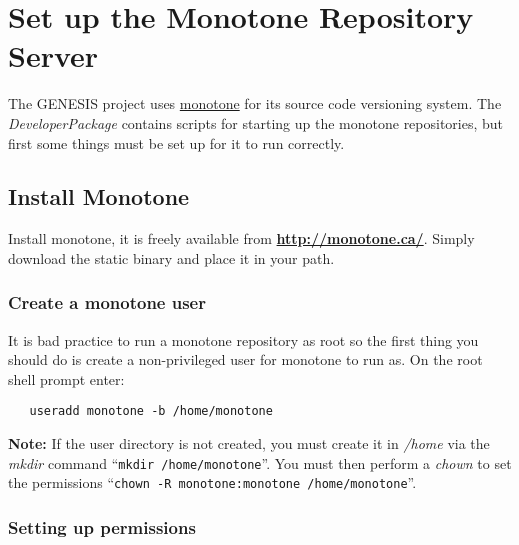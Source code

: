 \documentclass[12pt]{article}
\begin{document}
\section*{Set up the Monotone Repository Server}

The GENESIS project uses \href{http://www.monotone.ca/}{monotone} for its source code versioning system. The {\it DeveloperPackage} contains scripts for starting up the monotone repositories, but first some things must be set up for it to run correctly.

\subsection*{Install Monotone}

Install monotone, it is freely available from \href{http://monotone.ca/}{\bf http://monotone.ca/}. Simply download the static binary and place it in your path.

\subsubsection*{Create a monotone user}

It is bad practice to run a monotone repository as root so the first thing you should do is create a non-privileged user for monotone to run as. On the root shell prompt enter:
\begin{verbatim}
   useradd monotone -b /home/monotone
\end{verbatim}
{\bf Note:} If the user directory is not created, you must create it in  {\it /home} via the {\it mkdir} command ``{\tt mkdir /home/monotone}''. You must then perform a {\it chown} to set the permissions ``{\tt chown -R monotone:monotone /home/monotone}''.

\subsubsection*{Setting up permissions}
\end{document}

